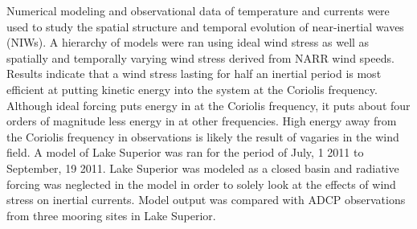 
Numerical modeling and observational data of temperature and currents were used to study the spatial 
structure and temporal evolution of near-inertial waves (NIWs). A hierarchy of models were ran using ideal 
wind stress as well as spatially and temporally varying wind stress derived from NARR wind speeds. 
Results indicate that a wind stress lasting for half an inertial period is most efficient at putting kinetic energy into
the system at the Coriolis frequency.  Although ideal forcing puts energy in at the Coriolis frequency, it puts about four
orders of magnitude less energy in at other frequencies. High energy away from the Coriolis frequency in observations is likely
the result of vagaries in the wind field. A model of Lake Superior was ran for the period of July, 1 2011 to 
September, 19 2011. Lake Superior was modeled as a closed basin and radiative forcing was neglected in the model in order
to solely look at the effects of wind stress on inertial currents. Model output was compared with ADCP observations from 
three mooring sites in Lake Superior. 

